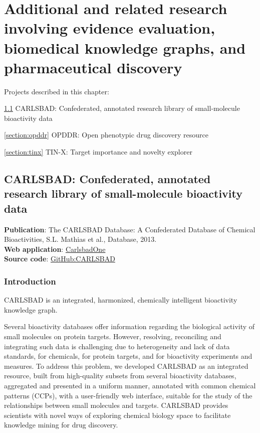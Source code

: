 \chapter{Additional and related research involving evidence evaluation, biomedical knowledge graphs, and pharmaceutical discovery}


\vspace*{\fill}
Projects described in this chapter:


\noindent
\ref{section:carlsbad} CARLSBAD: Confederated, annotated research library of small-molecule bioactivity data

\noindent
\ref{section:opddr} OPDDR: Open phenotypic drug discovery resource

\noindent
\ref{section:tinx} TIN-X: Target importance and novelty explorer

\vspace*{\fill}


\newpage
\section{CARLSBAD: Confederated, annotated research library of small-molecule bioactivity data}
\label{section:carlsbad}

\textbf{Publication}: The CARLSBAD Database: A Confederated Database of Chemical Bioactivities, S.L. Mathias et al., Database, 2013\cite{Mathias2013-hj}.\\
\textbf{Web application}: \href{https://datascience.unm.edu/tomcat/carlsbad/carlsbadone}{CarlsbadOne}\\
\textbf{Source code}: \href{https://github.com/unmtransinfo/CARLSBAD}{GitHub:CARLSBAD}

\subsection{Introduction}

CARLSBAD is an integrated, harmonized, chemically intelligent bioactivity knowledge graph.

Several bioactivity databases offer information regarding the biological activity of small molecules on protein targets. However, resolving, reconciling and integrating such data is challenging due to heterogeneity and lack of data standards, for chemicals, for protein targets, and for bioactivity experiments and measures. To address this problem, we developed CARLSBAD as an integrated resource, built from high-quality subsets from several bioactivity databases, aggregated and presented in a uniform manner, annotated with common chemical patterns (CCPs), with a user-friendly web interface, suitable for the study of the relationships between small molecules and targets. CARLSBAD provides scientists with novel ways of exploring chemical biology space to facilitate knowledge mining for drug discovery. 

